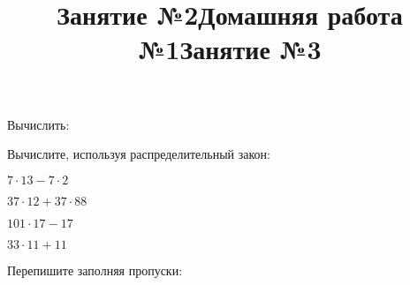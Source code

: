 %
%

\begin{class}[number=1]
\begin{listofex}
	\item Вычислить:
	\begin{enumcols}[itemcolumns=2]
		\item {}
		\item {}
		\item {}
		\item {}
	\end{enumcols}
	\item {}
\end{listofex}
\newpage
\title{Занятие №2}
\begin{listofex}
	\item {}
	\item {}
	\item {}
	\item {}
	\item {}
	\item {}
	\item {}
\end{listofex}
\newpage
\title{Домашняя работа №1}
\begin{listofex}
	\item {} 
	\item {}
	\item {}
	\item {}
\end{listofex}
\newpage
\title{Занятие №3}
\begin{listofex}
	\item Вычислите, используя распределительный закон:
	\begin{enumcols}[itemcolumns=2]
		\item \( 7\cdot13-7\cdot2 \)
		\item \( 37\cdot12+37\cdot88 \)
		\item \( 101\cdot17-17 \)
		\item \( 33\cdot11+11 \)
	\end{enumcols}
	\item Перепишите заполняя пропуски:
	\begin{enumcols}[itemcolumns=2]

\end{enumcols}
\end{listofex}
\end{class}
